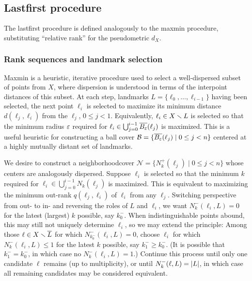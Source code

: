 \documentclass[
]{article}
\begin{document}
\hypertarget{lastfirst-procedure}{%
\subsection{Lastfirst procedure}\label{lastfirst-procedure}}

The lastfirst procedure is defined analogously to the maxmin procedure,
substituting ``relative rank'' for the pseudometric \(d_X\).

\hypertarget{rank-sequences-and-landmark-selection}{%
\subsubsection{Rank sequences and landmark
selection}\label{rank-sequences-and-landmark-selection}}

Maxmin is a heuristic, iterative procedure used to select a
well-dispersed subset of points from \(X\), where dispersion is
understood in terms of the interpoint distances of this subset. At each
step, landmarks \(L = \{\ell_0, \ldots, \ell_{i-1}\}\) having been
selected, the next point \(\ell_i\) is selected to maximize its minimum
distance \(d(\ell_j,\ell_i)\) from the \(\ell_j\), \(0 \leq j < 1\).
Equivalently, \(\ell_i \in X \smallsetminus L\) is selected so that the minimum
radius \(\varepsilon\) required for
\(\ell_i \in \bigcup_{j=0}^{i-1}{\overline{B_\varepsilon}(\ell_j)}\) is maximized.
This is a useful heuristic for constructing a ball cover
\(\mathcal{B} = \{\overline{B_\varepsilon}(\ell_j) \mid 0 \leq j < n\}\) centered at
a highly mutually distant set of landmarks.

We desire to construct a neighborhoodcover
\(\mathcal{N} = \{N^+_k(\ell_j) \mid 0 \leq j < n\}\) whose centers are
analogously dispersed. Suppose \(\ell_i\) is selected so that the
minimum \(k\) required for
\(\ell_i \in \bigcup_{j=0}^{i-1}{N_k(\ell_j)}\) is maximized. This is
equivalent to maximizing the minimum out-rank \(q(\ell_j,\ell_i)\) of
\(\ell_i\) from any \(\ell_j\). Switching perspective from out- to in-
and reversing the roles of \(L\) and \(\ell_i\), we want
\(N^-_k(\ell_i,L)=0\) for the latest (largest) \(k\) possible, say
\(k^-_0\). When indistinguishable points abound, this may still not
uniquely determine \(\ell_i\), so we may extend the principle: Among
those \(\ell\in X\smallsetminus \overline{L}\) for which \(N^-_{k^-_0}(\ell_i,L)=0\),
choose \(\ell_i\) for which \(N^-_{k}(\ell_i,L) \leq 1\) for the latest
\(k\) possible, say \(k^-_1 \geq k^-_0\). (It is possible that
\(k^-_1 = k^-_0\), in which case no \(N^-_k(\ell_i,L) = 1\).) Continue
this process until only one candidate \(\ell\) remains (up to
multiplicity), or until \(N^-_{k}(\ell,L)=\lvert L\rvert\), in which case all
remaining candidates may be considered equivalent.
\end{document}
